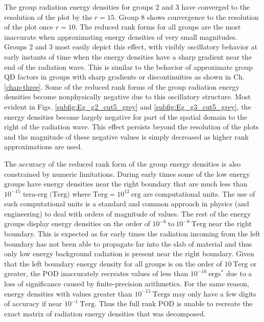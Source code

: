 	\ind The group radiation energy densities for groups 2 and 3 have converged to the resolution of the plot by the $r=15$. Group 8 shows convergence to the resolution of the plot once $r=10$. The reduced rank forms for all groups are the most inaccurate when approximating energy densities of very small magnitudes. Groups 2 and 3 most easily depict this effect, with visibly oscillatory behavior at early instants of time when the energy densities have a sharp gradient near the end of the radiation wave. This is similar to the behavior of approximate group QD factors in groups with sharp gradients or discontinuities as shown in Ch. \ref{chap-three}. Some of the reduced rank forms of the group radiation energy densities become nonphysically negative due to this oscillatory structure. Most evident in Figs. \ref{subfig:Eg_g2_cut5_grey} and \ref{subfig:Eg_g3_cut5_grey}, the energy densities become largely negative for part of the spatial domain to the right of the radiation wave. This effect persists beyond the resolution of the plots and the magnitude of these negative values is simply decreased as higher rank approximations are used. 
	
	\ind The accuracy of the reduced rank form of the group energy densities is also constrained by numeric limitations. During early times some of the low energy groups have energy densities near the right boundary that are much less than $10^{-15}$ $\text{tera-erg (Terg)}$ where $\text{Terg} = 10^{12} \ \text{erg}$ are computational units. The use of such computational units is a standard and common approach in physics (and engineering) to deal with orders of magnitude of values. The rest of the energy groups display energy densities on the order of $10^{-6} \ \text{to} \ 10^{-8} \ \text{Terg}$ near the right boundary. This is expected as for early times the radiation incoming from the left boundary has not been able to propagate far into the slab of material and thus only low energy background radiation is present near the right boundary. Given that the left boundary energy density for all groups is on the order of $10 \ \text{Terg}$ or greater, the POD inaccurately recreates values of less than $10^{-16} \ \text{ergs}^*$ due to a loss of significance caused by finite-precision arithmetics. For the same reason, energy densities with values greater than $10^{-15} \ \text{Tergs}$ may only have a few digits of accuracy if near $10^{-1} \ \text{Terg}$. Thus the full rank POD is unable to recreate the exact matrix of radiation energy densities that was decomposed.

